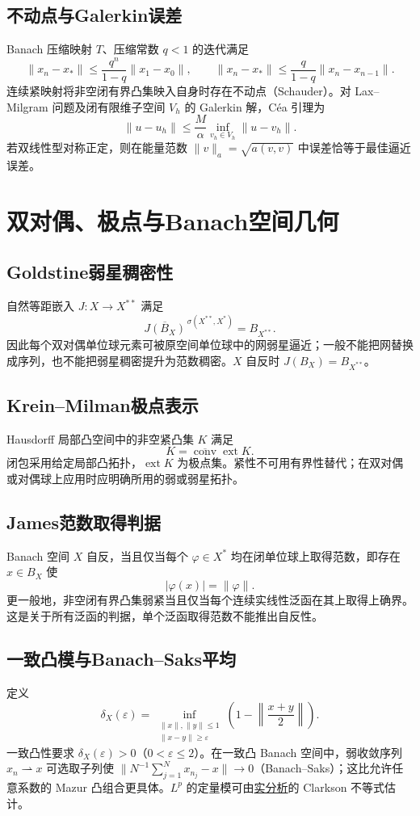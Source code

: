 \documentclass[../main.tex]{subfiles}
\begin{document}
\subsection{不动点与Galerkin误差}
Banach 压缩映射 $T$、压缩常数 $q<1$ 的迭代满足
\[
\|x_n-x_*\|\le\frac{q^n}{1-q}\|x_1-x_0\|,\qquad
\|x_n-x_*\|\le\frac q{1-q}\|x_n-x_{n-1}\|.
\]
连续紧映射将非空闭有界凸集映入自身时存在不动点（Schauder）。对 Lax--Milgram 问题及闭有限维子空间 $V_h$ 的 Galerkin 解，Céa 引理为
\[
\|u-u_h\|\le\frac M\alpha\inf_{v_h\in V_h}\|u-v_h\|.
\]
若双线性型对称正定，则在能量范数 $\|v\|_a=\sqrt{a(v,v)}$ 中误差恰等于最佳逼近误差。

\section{双对偶、极点与Banach空间几何}
\subsection{Goldstine弱星稠密性}
自然等距嵌入 $J:X\to X^{**}$ 满足
\[
\overline{J(B_X)}^{\,\sigma(X^{**},X^*)}=B_{X^{**}}.
\]
因此每个双对偶单位球元素可被原空间单位球中的网弱星逼近；一般不能把网替换成序列，也不能把弱星稠密提升为范数稠密。$X$ 自反时 $J(B_X)=B_{X^{**}}$。
\subsection{Krein--Milman极点表示}
Hausdorff 局部凸空间中的非空紧凸集 $K$ 满足
\[
K=\overline{\operatorname{conv}}\operatorname{ext}K.
\]
闭包采用给定局部凸拓扑，$\operatorname{ext}K$ 为极点集。紧性不可用有界性替代；在双对偶或对偶球上应用时应明确所用的弱或弱星拓扑。
\subsection{James范数取得判据}
Banach 空间 $X$ 自反，当且仅当每个 $\varphi\in X^*$ 均在闭单位球上取得范数，即存在 $x\in B_X$ 使
\[
|\varphi(x)|=\|\varphi\|.
\]
更一般地，非空闭有界凸集弱紧当且仅当每个连续实线性泛函在其上取得上确界。这是关于所有泛函的判据，单个泛函取得范数不能推出自反性。
\subsection{一致凸模与Banach--Saks平均}
定义
\[
\delta_X(\varepsilon)=\inf_{\substack{\|x\|,\|y\|\le1\\\|x-y\|\ge\varepsilon}}
\left(1-\left\|\frac{x+y}2\right\|\right).
\]
一致凸性要求 $\delta_X(\varepsilon)>0$（$0<\varepsilon\le2$）。在一致凸 Banach 空间中，弱收敛序列 $x_n\rightharpoonup x$ 可选取子列使 $\|N^{-1}\sum_{j=1}^Nx_{n_j}-x\|\to0$（Banach--Saks）；这比允许任意系数的 Mazur 凸组合更具体。$L^p$ 的定量模可由\hyperref[chap:real-analysis]{实分析}的 Clarkson 不等式估计。
\end{document}
